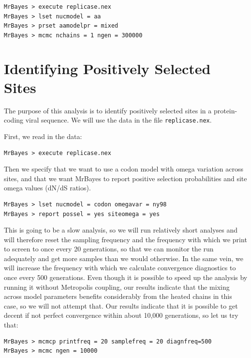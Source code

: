 \documentclass[12pt]{book}
\begin{document}
\begin{singlespacing}
\begin{verbatim}
MrBayes > execute replicase.nex
MrBayes > lset nucmodel = aa
MrBayes > prset aamodelpr = mixed
MrBayes > mcmc nchains = 1 ngen = 300000
\end{verbatim}
\end{singlespacing}

\section{Identifying Positively Selected Sites}
The purpose of this analysis is to identify positively selected sites in a protein-coding viral sequence.
We will use the data in the file \texttt{replicase.nex}.

First, we read in the data:

\begin{verbatim}
MrBayes > execute replicase.nex
\end{verbatim}

Then we specify that we want to use a codon model with omega variation across sites, and that we want MrBayes to report positive selection probabilities and site omega values (dN/dS ratios).

\begin{singlespacing}
\begin{verbatim}
MrBayes > lset nucmodel = codon omegavar = ny98
MrBayes > report possel = yes siteomega = yes
\end{verbatim}
\end{singlespacing}

This is going to be a slow analysis, so we will run relatively short analyses and will therefore reset the sampling
frequency and the frequency with which we print to screen to once every 20 generations, so that we can monitor
the run adequately and get more samples than we would otherwise. In the same vein, we will increase the frequency
with which we calculate convergence diagnostics to once every 500 generations. Even though it is possible to speed
up the analysis by running it without Metropolis coupling, our results indicate that the mixing across model parameters
benefits considerably from the heated chains in this case, so we will not attempt that. Our results indicate that it
is possible to get decent if not perfect convergence within about 10,000 generations, so let us try that:

\begin{singlespacing}
\begin{verbatim}
MrBayes > mcmcp printfreq = 20 samplefreq = 20 diagnfreq=500
MrBayes > mcmc ngen = 10000
\end{verbatim}
\end{singlespacing}
\end{document}
